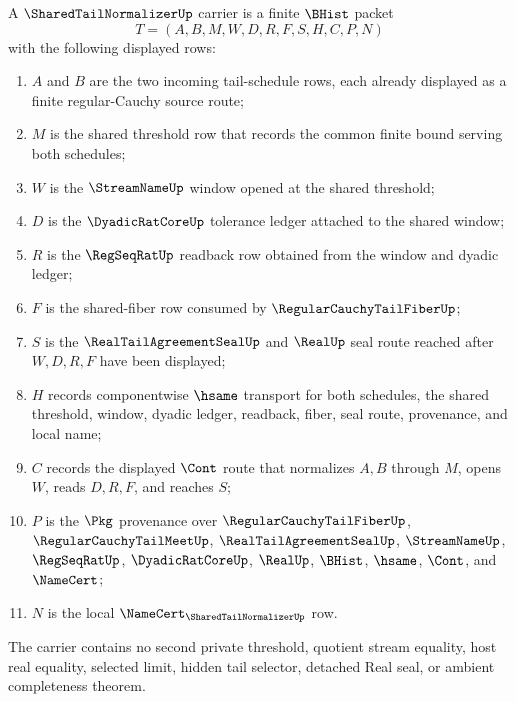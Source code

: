 \begin{definition}
\label{def:shared-tail-normalizer-carrier}
A $\SharedTailNormalizerUp$ carrier is a finite $\BHist$ packet
$$
T=(A,B,M,W,D,R,F,S,H,C,P,N)
$$
with the following displayed rows:
\begin{enumerate}
\item $A$ and $B$ are the two incoming tail-schedule rows, each already displayed as a finite regular-Cauchy source route;
\item $M$ is the shared threshold row that records the common finite bound serving both schedules;
\item $W$ is the $\StreamNameUp$ window opened at the shared threshold;
\item $D$ is the $\DyadicRatCoreUp$ tolerance ledger attached to the shared window;
\item $R$ is the $\RegSeqRatUp$ readback row obtained from the window and dyadic ledger;
\item $F$ is the shared-fiber row consumed by $\RegularCauchyTailFiberUp$;
\item $S$ is the $\RealTailAgreementSealUp$ and $\RealUp$ seal route reached after $W,D,R,F$ have been displayed;
\item $H$ records componentwise $\hsame$ transport for both schedules, the shared threshold, window, dyadic ledger, readback, fiber, seal route, provenance, and local name;
\item $C$ records the displayed $\Cont$ route that normalizes $A,B$ through $M$, opens $W$, reads $D,R,F$, and reaches $S$;
\item $P$ is the $\Pkg$ provenance over $\RegularCauchyTailFiberUp$, $\RegularCauchyTailMeetUp$, $\RealTailAgreementSealUp$, $\StreamNameUp$, $\RegSeqRatUp$, $\DyadicRatCoreUp$, $\RealUp$, $\BHist$, $\hsame$, $\Cont$, and $\NameCert$;
\item $N$ is the local $\NameCert_{\SharedTailNormalizerUp}$ row.
\end{enumerate}
The carrier contains no second private threshold, quotient stream equality, host real equality, selected limit, hidden tail selector, detached Real seal, or ambient completeness theorem.
\end{definition}

